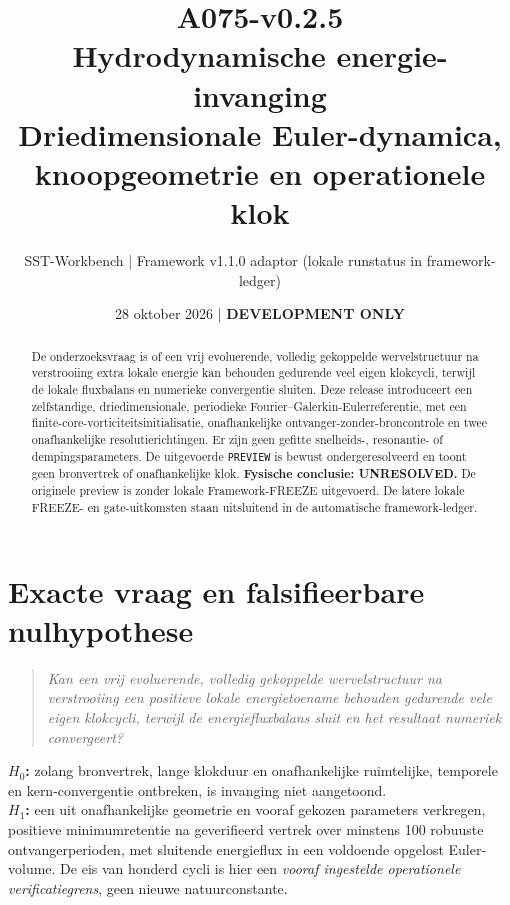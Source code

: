 \documentclass[10pt,a4paper]{article}
\title{\textcolor{main}{A075-v0.2.5}\\Hydrodynamische energie-invanging\\\large Driedimensionale Euler-dynamica, knoopgeometrie en operationele klok}
\author{SST-Workbench | Framework v1.1.0 adaptor (lokale runstatus in framework-ledger)}
\date{28 oktober 2026 | \textbf{DEVELOPMENT ONLY}}
\begin{document}
\maketitle
\begin{abstract}
De onderzoeksvraag is of een vrij evoluerende, volledig gekoppelde wervelstructuur na verstrooiing extra lokale energie kan behouden gedurende veel eigen klokcycli, terwijl de lokale fluxbalans en numerieke convergentie sluiten. Deze release introduceert een zelfstandige, driedimensionale, periodieke Fourier--Galerkin-Eulerreferentie, met een finite-core-vorticiteitsinitialisatie, onafhankelijke ontvanger-zonder-broncontrole en twee onafhankelijke resolutierichtingen. Er zijn geen gefitte snelheids-, resonantie- of dempingsparameters. De uitgevoerde \texttt{PREVIEW} is bewust ondergeresolveerd en toont geen bronvertrek of onafhankelijke klok. \textbf{Fysische conclusie: UNRESOLVED.} De originele preview is zonder lokale Framework-FREEZE uitgevoerd. De latere lokale FREEZE- en gate-uitkomsten staan uitsluitend in de automatische framework-ledger.
\end{abstract}
\section{Exacte vraag en falsifieerbare nulhypothese}
\begin{quote}\emph{Kan een vrij evoluerende, volledig gekoppelde wervelstructuur na verstrooiing een positieve lokale energietoename behouden gedurende vele eigen klokcycli, terwijl de energiefluxbalans sluit en het resultaat numeriek convergeert?}\end{quote}
\textbf{$H_0$:} zolang bronvertrek, lange klokduur en onafhankelijke ruimtelijke, temporele en kern-convergentie ontbreken, is invanging niet aangetoond.\\
\textbf{$H_1$:} een uit onafhankelijke geometrie en vooraf gekozen parameters verkregen, positieve minimumretentie na geverifieerd vertrek over minstens 100 robuuste ontvangerperioden, met sluitende energieflux in een voldoende opgelost Euler-volume.
De eis van honderd cycli is hier een \emph{vooraf ingestelde operationele verificatiegrens}, geen nieuwe natuurconstante.
\end{document}

